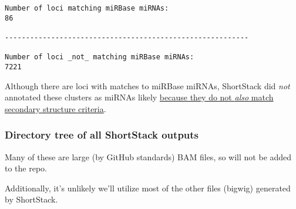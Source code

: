 \documentclass[
]{article}
\newenvironment{Shaded}{\begin{snugshade}}{\end{snugshade}}
\newcommand{\AttributeTok}[1]{\textcolor[rgb]{0.77,0.63,0.00}{#1}}
\newcommand{\BuiltInTok}[1]{#1}
\newcommand{\CommentTok}[1]{\textcolor[rgb]{0.56,0.35,0.01}{\textit{#1}}}
\newcommand{\DataTypeTok}[1]{\textcolor[rgb]{0.13,0.29,0.53}{#1}}
\newcommand{\FunctionTok}[1]{\textcolor[rgb]{0.00,0.00,0.00}{#1}}
\newcommand{\KeywordTok}[1]{\textcolor[rgb]{0.13,0.29,0.53}{\textbf{#1}}}
\newcommand{\NormalTok}[1]{#1}
\newcommand{\StringTok}[1]{\textcolor[rgb]{0.31,0.60,0.02}{#1}}
\newcommand{\VariableTok}[1]{\textcolor[rgb]{0.00,0.00,0.00}{#1}}
\begin{document}
\begin{Shaded}
\end{Shaded}

\begin{verbatim}
Number of loci matching miRBase miRNAs:
86

----------------------------------------------------------

Number of loci _not_ matching miRBase miRNAs:
7221
\end{verbatim}

Although there are loci with matches to miRBase miRNAs, ShortStack did \emph{not} annotated these clusters as miRNAs likely \href{https://github.com/MikeAxtell/ShortStack\#mirna-annotation}{because they do not \emph{also} match secondary structure criteria}.

\hypertarget{directory-tree-of-all-shortstack-outputs}{%
\subsubsection{Directory tree of all ShortStack outputs}\label{directory-tree-of-all-shortstack-outputs}}

Many of these are large (by GitHub standards) BAM files, so will not be added to the repo.

Additionally, it's unlikely we'll utilize most of the other files (bigwig) generated by ShortStack.
\end{document}
